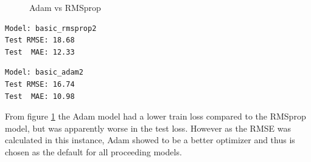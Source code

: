﻿\documentclass[10pt,11pt,12pt,oneside]{book}
\begin{document}
\begin{figure}[H]
    \centering
    \qquad
    \caption{Adam vs RMSprop}%
    \label{fig:basic}%
\end{figure}
\pagebreak
\begin{multicols}{2}
\centering
\begin{verbatim}
Model: basic_rmsprop2
Test RMSE: 18.68
Test  MAE: 12.33
\end{verbatim}
\begin{verbatim}
Model: basic_adam2
Test RMSE: 16.74
Test  MAE: 10.98
\end{verbatim}
\end{multicols}
From figure \ref{fig:basic} the Adam model had a lower train loss compared to the RMSprop model, but was apparently worse in the test loss. However as the RMSE was calculated in this instance, Adam showed to be a better optimizer and thus is chosen as the default for all proceeding models.\\
\end{document}

